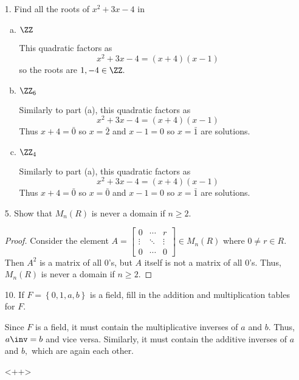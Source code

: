 \documentclass{article}
\begin{document}
\begin{itemize}
	\item[1.] Find all the roots of $x^2+3x-4$ in
		\begin{enumerate}[(a)]
			\item $\ZZ$
				\begin{soln}
					This quadratic factors as \[x^2+3x-4=(x+4)(x-1)\] so the roots are $1, -4\in \ZZ.$
				\end{soln}

			\item $\ZZ_6$
				\begin{soln}
					Similarly to part (a), this quadratic factors as \[x^2+3x-4=(x+4)(x-1)\] Thus $x+4=\bar{0}$ so $x=\bar{2}$ and $x-1=0$ so $x=\bar{1}$ are solutions. 
				\end{soln}

			\item $\ZZ_4$
				\begin{soln}
					Similarly to part (a), this quadratic factors as \[x^2+3x-4=(x+4)(x-1)\] Thus $x+4=\bar{0}$ so $x=\bar{0}$ and $x-1=0$ so $x=\bar{1}$ are solutions. 
				\end{soln}
				
		\end{enumerate}

	\item[5.] Show that $M_n(R)$ is never a domain if $n\ge 2.$
		\begin{proof}
			Consider the element $A=\begin{bmatrix}
				0 & \cdots & r \\
				\vdots & \ddots & \vdots \\
				0 & \cdots & 0
			\end{bmatrix}\in M_n(R)$ where $0\neq r\in R.$ Then $A^2$ is a matrix of all 0's, but $A$ itself is not a matrix of all 0's. Thus, $M_n(R)$ is never a domain if $n\ge 2.$
		\end{proof}

	\item[10.] If $F=\left\{ 0, 1, a, b \right\}$ is a field, fill in the addition and multiplication tables for $F.$
		\begin{soln}
			Since $F$ is a field, it must contain the multiplicative inverses of $a$ and $b.$ Thus, $a\inv=b$ and vice versa. Similarly, it must contain the additive inverses of $a$ and $b,$ which are again each other. 
		\end{soln}<++>
		
\end{itemize}
\end{document}
